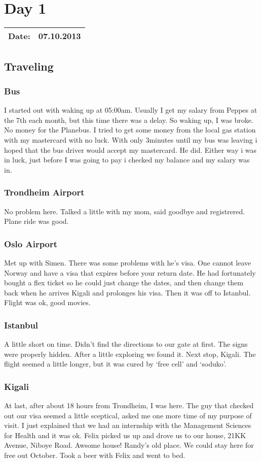 \section{Day 1}
\begin{tabular}{|c|c|}
\hline
Date: & 07.10.2013 \\
\hline
\end{tabular}
\subsection{Traveling}
\subsubsection{Bus}
I started out with waking up at 05:00am. Usually I get my salary from Peppes at the 7th each month, but this time there was a delay.
So waking up, I was broke. No money for the Planebus. I tried to get some money from the local gas station with my mastercard with no luck.
With only 3minutes until my bus was leaving i hoped that the bus driver would accept my mastercard. He did.
Either way i was in luck, just before I was going to pay i checked my balance and my salary was in.
\subsubsection{Trondheim Airport}
No problem here. Talked a little with my mom, said goodbye and registrered. Plane ride was good.
\subsubsection{Oslo Airport}
Met up with Simen. There was some problems with he's visa. One cannot leave Norway and have a visa that expires before your return date.
He had fortunately bought a flex ticket so he could just change the dates, and then change them back when he arrives Kigali and prolonges his visa.
Then it was off to Istanbul. Flight was ok, good movies.
\subsubsection{Istanbul}
A little short on time. Didn't find the directions to our gate at first. The signs were properly hidden. After a little exploring we found it. Next stop, Kigali.
The flight seemed a little longer, but it was cured by `free cell' and `soduko'.
\subsubsection{Kigali}
At last, after about 18 hours from Trondheim, I was here. The guy that checked out our visa seemed a little sceptical, asked me one more time of my purpose of visit.
I just explained that we had an internship with the Management Sciences for Health and it was ok.
Felix picked us up and drove us to our house, 21KK Avenue, Niboye Road.
Awsome house! Randy's old place. We could stay here for free out October.
Took a beer with Felix and went to bed.
